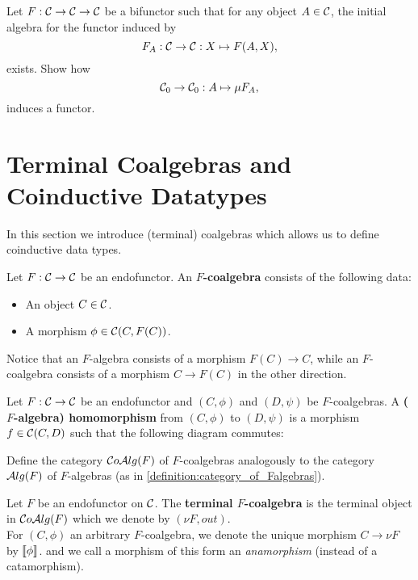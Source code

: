 \begin{exer} Let $F:\mathcal{C}\to\mathcal{C}\to\mathcal{C}$ be a bifunctor such that for any object $A\in\mathcal{C}$, the initial algebra for the functor induced by 
\[
F_A : \mathcal{C}\to\mathcal{C} : X\mapsto F(A,X),
\]
exists. Show how
\[
{\mathcal{C}}_0 \to {\mathcal{C}}_0 : A\mapsto \mu F_A ,
\]
induces a functor.
\end{exer}


\section{Terminal Coalgebras and Coinductive Datatypes}
In this section we introduce (terminal) coalgebras which allows us to define coinductive data types.

\begin{dfn} Let $F:\mathcal{C}\to \mathcal{C}$ be an endofunctor. An \textbf{$F$-coalgebra} consists of the following data:
\begin{itemize}
\item An object $C\in \mathcal{C}$.
\item A morphism $\phi \in {\mathcal{C}}(C,F(C))$.
\end{itemize}
\end{dfn}
Notice that an $F$-algebra consists of a morphism $F(C)\to C$, while an $F$-coalgebra consists of a morphism $C\to F(C)$ in the other direction.

\begin{dfn} Let $F:\mathcal{C}\to \mathcal{C}$ be an endofunctor and $(C,\phi)$ and $(D,\psi)$ be $F$-coalgebras. A \textbf{($F$-algebra) homomorphism} from $(C,\phi)$ to $(D,\psi)$ is a morphism $f\in {\mathcal{C}}(C,D)$ such that the following diagram commutes:
\begin{center}
\end{center}
\end{dfn}

\begin{exer} Define the category $\mathcal{C}o\mathcal{A}lg(F)$ of $F$-coalgebras analogously to the category $\mathcal{A}lg(F)$ of $F$-algebras (as in \cref{definition:category_of_Falgebras}).
\end{exer}

\begin{dfn} Let $F$ be an endofunctor on $\mathcal{C}$. The \textbf{terminal $F$-coalgebra} is the terminal object in $\mathcal{C}o\mathcal{A}lg(F)$ which we denote by $(\nu F, out)$.\\
For $(C,\phi)$ an arbitrary $F$-coalgebra, we denote the unique morphism $C\to \nu F$ by $\llbracket \phi \rrbracket$. and we call a morphism of this form an \textit{anamorphism} (instead of a catamorphism).
\end{dfn}

